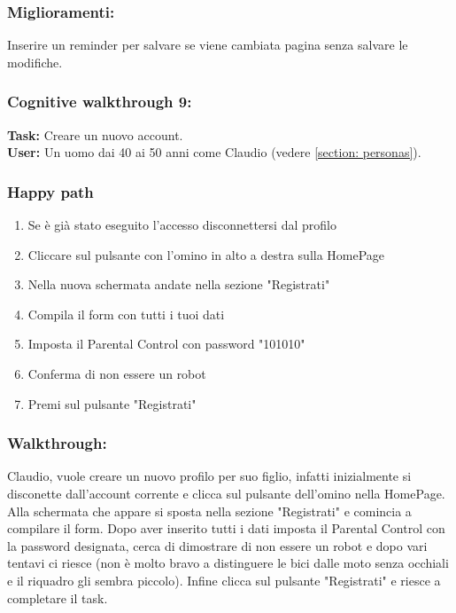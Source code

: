 \documentclass[../Report.tex]{subfiles}
\begin{document}
    \subsubsection{Miglioramenti:}
    Inserire un reminder per salvare se viene cambiata pagina senza salvare le modifiche.
    \subsubsection{Cognitive walkthrough 9:}
    \textbf{Task:} Creare un nuovo account.\\
    \textbf{User:} Un uomo dai 40 ai 50 anni come Claudio (vedere \ref{section: personas}).\\

    \subsubsection{Happy path}
    \begin{enumerate}
        \item Se è già stato eseguito l'accesso disconnettersi dal profilo
        \item Cliccare sul pulsante con l’omino in alto a destra sulla HomePage
        \item Nella nuova schermata andate nella sezione "Registrati" 
        \item Compila il form con tutti i tuoi dati
        \item Imposta il Parental Control con password "101010"
        \item Conferma di non essere un robot
        \item Premi sul pulsante "Registrati"
    \end{enumerate}

    \subsubsection{Walkthrough:}
    Claudio, vuole creare un nuovo profilo per suo figlio, infatti inizialmente si disconette dall'account corrente e clicca sul pulsante dell'omino nella HomePage.
    Alla schermata che appare si sposta nella sezione "Registrati" e comincia a compilare il form. Dopo aver inserito tutti i dati imposta il Parental Control con la password designata, cerca di dimostrare di non essere un robot e dopo vari tentavi ci riesce (non è molto bravo a distinguere le bici dalle moto senza occhiali e il riquadro gli sembra piccolo). Infine clicca sul pulsante "Registrati" e riesce a completare il task.
\end{document}
